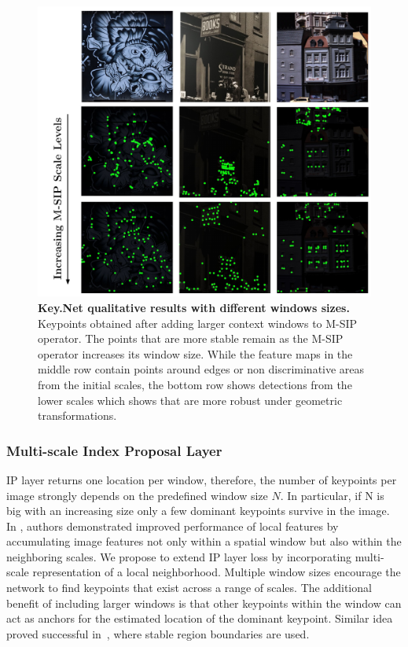 \begin{figure}
\vspace{-0.10cm}
 \hspace*{-0.4cm} 
 \centering
   \includegraphics[width=\linewidth]{main/chapter02/figures/M-SIP_Scale_Levels_v5.pdf}
   \vspace{-0.2cm}
    \caption[Key.Net qualitative results with different windows sizes]{\textbf{Key.Net qualitative results with different windows sizes.} Keypoints obtained after adding larger context windows to M-SIP operator. The points that are more stable remain as the M-SIP operator increases its window size. While the feature maps in the middle row contain points around edges or non discriminative areas from the initial scales, the bottom row shows detections from the lower scales which shows that are more robust under geometric transformations.}
    \label{fig:M-SIP_Scale_Levels}
\end{figure}

\subsubsection{Multi-scale Index Proposal Layer}
\label{keynet_sec:multi_index_proposal_layer}

IP layer returns one location per window, therefore, the number of keypoints per image strongly depends on the predefined window size $N$. In particular, if N is big with an increasing size only a few dominant keypoints survive in the image. In \cite{DSPSIFT_soatto}, authors demonstrated improved performance of local features by accumulating image features not only within a spatial window but also within the neighboring scales. We propose to extend IP layer loss by incorporating multi-scale representation of a local neighborhood. Multiple window sizes encourage the network to find keypoints that exist across a range of scales. The additional benefit of including larger windows is that other keypoints within the window can act as anchors for the estimated location of the dominant keypoint. Similar idea proved successful in~\cite{Local_affine_frames_Matas}, where stable region boundaries are used.

